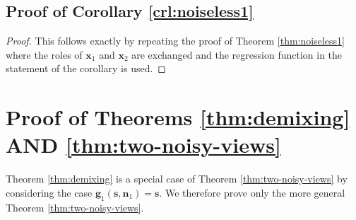 \subsection{Proof of Corollary \ref{crl:noiseless1}}\label{appendix:proof-cor2}
\begin{proof}
This follows exactly by repeating the proof of Theorem \ref{thm:noiseless1} where the roles of $\bm{x}_1$ and $\bm{x}_2$ are exchanged and the regression function in the statement of the corollary is used.
\end{proof}

\section{Proof of Theorems \ref{thm:demixing} AND \ref{thm:two-noisy-views}}
\label{appendix:thm1}

Theorem \ref{thm:demixing} is a special case of Theorem \ref{thm:two-noisy-views} by considering the case $\bm{g}_1(\bm{s}, \bm{n}_1) = \bm{s}$.
We therefore prove only the more general Theorem \ref{thm:two-noisy-views}.

